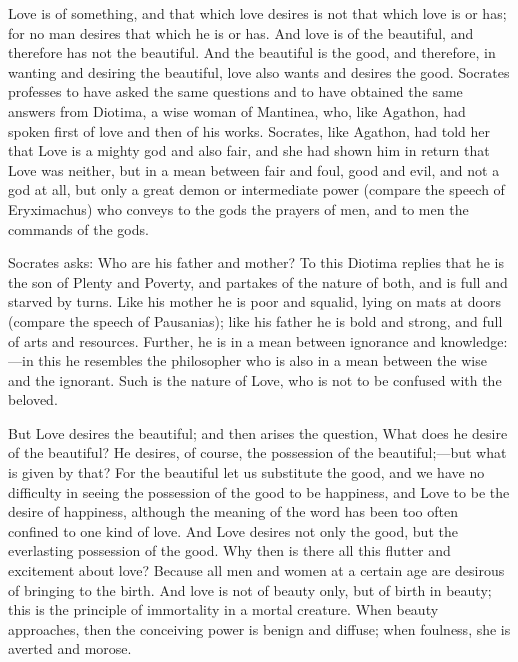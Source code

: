 \documentclass[11pt,letter]{article}
\begin{document}
\par  Love is of something, and that which love desires is not that which love is or has; for no man desires that which he is or has. And love is of the beautiful, and therefore has not the beautiful. And the beautiful is the good, and therefore, in wanting and desiring the beautiful, love also wants and desires the good. Socrates professes to have asked the same questions and to have obtained the same answers from Diotima, a wise woman of Mantinea, who, like Agathon, had spoken first of love and then of his works. Socrates, like Agathon, had told her that Love is a mighty god and also fair, and she had shown him in return that Love was neither, but in a mean between fair and foul, good and evil, and not a god at all, but only a great demon or intermediate power (compare the speech of Eryximachus) who conveys to the gods the prayers of men, and to men the commands of the gods.

\par  Socrates asks: Who are his father and mother? To this Diotima replies that he is the son of Plenty and Poverty, and partakes of the nature of both, and is full and starved by turns. Like his mother he is poor and squalid, lying on mats at doors (compare the speech of Pausanias); like his father he is bold and strong, and full of arts and resources. Further, he is in a mean between ignorance and knowledge:—in this he resembles the philosopher who is also in a mean between the wise and the ignorant. Such is the nature of Love, who is not to be confused with the beloved.

\par  But Love desires the beautiful; and then arises the question, What does he desire of the beautiful? He desires, of course, the possession of the beautiful;—but what is given by that? For the beautiful let us substitute the good, and we have no difficulty in seeing the possession of the good to be happiness, and Love to be the desire of happiness, although the meaning of the word has been too often confined to one kind of love. And Love desires not only the good, but the everlasting possession of the good. Why then is there all this flutter and excitement about love? Because all men and women at a certain age are desirous of bringing to the birth. And love is not of beauty only, but of birth in beauty; this is the principle of immortality in a mortal creature. When beauty approaches, then the conceiving power is benign and diffuse; when foulness, she is averted and morose.
\end{document}
